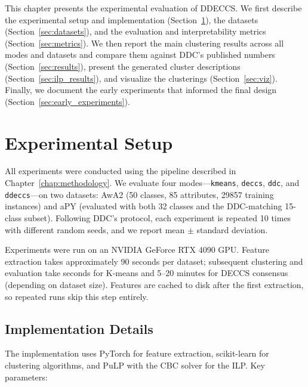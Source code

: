 \label{chap:experiments}

This chapter presents the experimental evaluation of DDECCS. We first describe the experimental setup and implementation (Section~\ref{sec:exp_setup}), the datasets (Section~\ref{sec:datasets}), and the evaluation and interpretability metrics (Section~\ref{sec:metrics}). We then report the main clustering results across all modes and datasets and compare them against DDC's published numbers (Section~\ref{sec:results}), present the generated cluster descriptions (Section~\ref{sec:ilp_results}), and visualize the clusterings (Section~\ref{sec:viz}). Finally, we document the early experiments that informed the final design (Section~\ref{sec:early_experiments}).

\section{Experimental Setup}
\label{sec:exp_setup}

All experiments were conducted using the pipeline described in Chapter~\ref{chap:methodology}. We evaluate four modes---\texttt{kmeans}, \texttt{deccs}, \texttt{ddc}, and \texttt{ddeccs}---on two datasets: AwA2 (50 classes, 85 attributes, 29857 training instances) and aPY (evaluated with both 32 classes and the DDC-matching 15-class subset). Following DDC's protocol, each experiment is repeated 10 times with different random seeds, and we report mean $\pm$ standard deviation.

Experiments were run on an NVIDIA GeForce RTX 4090 GPU. Feature extraction takes approximately 90 seconds per dataset; subsequent clustering and evaluation take seconds for K-means and 5--20 minutes for DECCS consensus (depending on dataset size). Features are cached to disk after the first extraction, so repeated runs skip this step entirely.


\subsection{Implementation Details}

The implementation uses PyTorch for feature extraction, scikit-learn for clustering algorithms, and PuLP with the CBC solver for the ILP. Key parameters:

